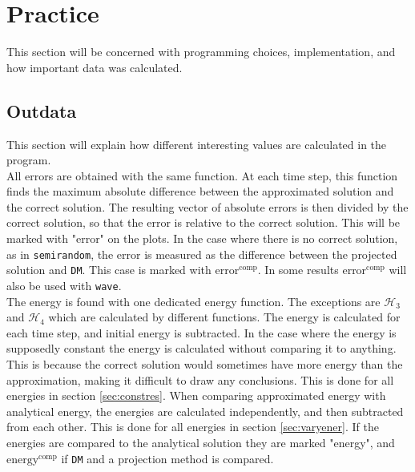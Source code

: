 \chapter{Practice}%
This section will be concerned with programming choices, implementation, and how important data was calculated.

\section{Outdata} %
This section will explain how different interesting values are calculated in the program. \\

\noindent All errors are obtained with the same function. At each time step, this function finds the maximum absolute difference between the approximated solution and the correct solution. The resulting vector of absolute errors is then divided by the correct solution, so that the error is relative to the correct solution. This will be marked with "error" on the plots. In the case where there is no correct solution, as in \texttt{semirandom}, the error is measured as the difference between the projected solution and \texttt{DM}. This case is marked with $\text{error}^{\text{comp}}$. In some results $\text{error}^{\text{comp}}$ will also be used with \texttt{wave}.  \\

\noindent The energy is found with one dedicated energy function. The exceptions are $\mathcal{H}_3$ and $\mathcal{H}_4$ which are calculated by different functions. The energy is calculated for each time step, and initial energy is subtracted. In the case where the energy is supposedly constant the energy is calculated without comparing it to anything. This is because the correct solution would sometimes have more energy than the approximation, making it difficult to draw any conclusions. This is done for all energies in section \ref{sec:constres}. When comparing approximated energy with analytical energy, the energies are calculated independently, and then subtracted from each other. This is done for all energies in section \ref{sec:varyener}. If the energies are compared to the analytical solution they are marked "energy", and $\text{energy}^{\text{comp}}$ if \texttt{DM} and a projection method is compared. \\

